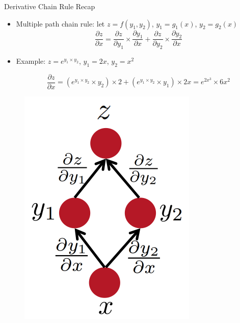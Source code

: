 \documentclass[handout]{beamer}
\begin{document}
\begin{frame}{Derivative Chain Rule Recap}
\begin{scriptsize}


\begin{itemize}
\item Multiple path chain rule: let $z = f(y_1,y_2)$, $y_1 = g_1(x)$, $y_2 =g_2(x)$ 
\begin{displaymath}
\frac{\partial z}{\partial x} = \frac{\partial z}{\partial y_1} \times \frac{\partial y_1}{\partial x} + \frac{\partial z}{\partial y_2} \times \frac{\partial y_2}{\partial x}
\end{displaymath}

\item  Example: $z= e^{y_1 \times y_2}$, $y_1 = 2x$, $y_2 = x^2$ 

\begin{displaymath}
\frac{\partial z}{\partial x} = (e^{y_1 \times y_2}\times y_2) \times 2 + (e^{y_1 \times y_2}\times y_1) \times 2x = e^{2x^3} \times 6x^2
\end{displaymath}


\end{itemize}


\begin{figure}[htb]
	\centering
	 \includegraphics[scale=0.3]{pics/multiple_paths_chain_rule.png}
\end{figure}


\end{scriptsize}
\end{frame}
\end{document}
